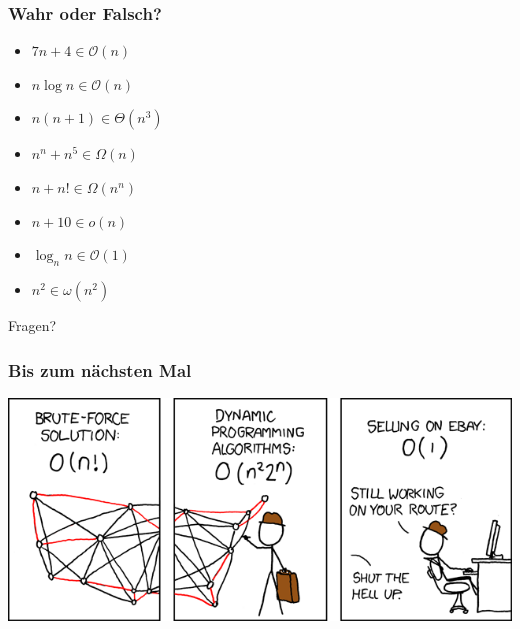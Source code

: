 \begin{frame}
	\frametitle{Wahr oder Falsch?}
	\begin{itemize}
		\item {$7n + 4 \in \mathcal{O}(n)$}
		\item {\only<3->{\color{red}}$n \log{n} \in \mathcal{O}(n)$}
		\item {$n(n+1) \in \Theta(n^3)$}
		\item {$n^n + n^5 \in \Omega(n)$}
		\item {\only<6->{\color{red}}$n + n! \in \Omega(n^n)$}
		\item {$n + 10 \in o(n)$}
		\item {$\log_n{n} \in \mathcal{O}(1)$}
		\item {$n^2 \in \omega(n^2)$}
	\end{itemize}
\end{frame}

\begin{frame}
	\Huge
	\begin{center}
		Fragen?
	\end{center}
\end{frame}

\begin{frame}
	\frametitle{Bis zum nächsten Mal}
	\includegraphics[width=\textwidth]{images/travelling_salesman_problem}
\end{frame}


